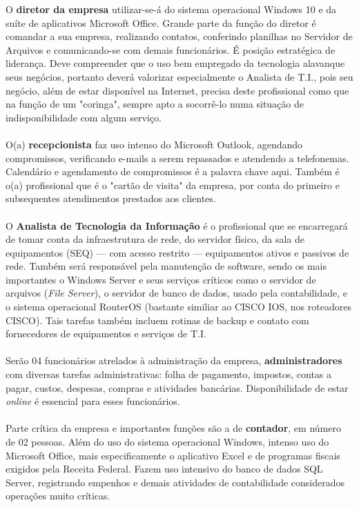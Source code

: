\documentclass[	DIV=calc,%
							paper=a4,%
							fontsize=12pt,%
							onecolumn]{scrartcl}	 					%
\begin{document}




O \textbf{diretor da empresa} utilizar-se-á do sistema operacional Windows 10 e da suíte de aplicativos Microsoft Office. Grande parte da função do diretor é comandar a sua empresa, realizando contatos, conferindo planilhas no Servidor de Arquivos e comunicando-se com demais funcionários. É posição estratégica de liderança. Deve compreender que o uso bem empregado da tecnologia alavanque seus negócios, portanto deverá valorizar especialmente o Analista de T.I., pois seu negócio, além de estar disponível na Internet, precisa deste profissional como que na função de um "coringa", sempre apto a socorrê-lo numa situação de indisponibilidade com algum serviço.
\\ \\
O(a) \textbf{recepcionista} faz uso intenso do Microsoft Outlook, agendando compromissos, verificando e-mails a serem repassados e atendendo a telefonemas. Calendário e agendamento de compromissos é a palavra chave aqui. Também é o(a) profissional que é o "cartão de visita" da empresa, por conta do primeiro e subsequentes atendimentos prestados aos clientes.
\\ \\
O \textbf{Analista de Tecnologia da Informação} é o profissional que se encarregará de tomar conta da infraestrutura de rede, do servidor físico, da sala de equipamentos (SEQ) --- com acesso restrito --- equipamentos ativos e passivos de rede. Também será responsável pela manutenção de software, sendo os mais importantes o Windows Server e seus serviços críticos como o servidor de arquivos (\textit{File Server}), o servidor de banco de dados, usado pela contabilidade, e o sistema operacional RouterOS (bastante similiar ao CISCO IOS, nos roteadores CISCO). Tais tarefas também incluem rotinas de backup e contato com fornecedores de equipamentos e serviços de T.I.
\\ \\
Serão 04 funcionários atrelados à administração da empresa, \textbf{administradores} com diversas tarefas administrativas: folha de pagamento, impostos, contas a pagar, custos, despesas, compras e atividades bancárias. Disponibilidade de estar \textit{online} é essencial para esses funcionários.
\\ \\
Parte crítica da empresa e importantes funções são a de \textbf{contador}, em número de 02 pessoas. Além do uso do sistema operacional Windows, intenso uso do Microsoft Office, mais especificamente o aplicativo Excel e de programas fiscais exigidos pela Receita Federal. Fazem uso intensivo do banco de dados SQL Server, registrando empenhos e demais atividades de contabilidade considerados operações muito críticas.
\end{document}
